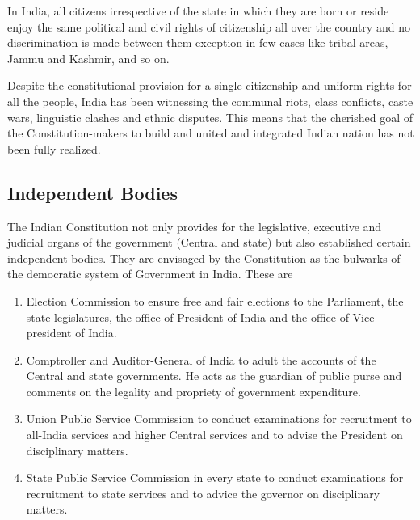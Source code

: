 \begin{multicols}{2}
In India, all citizens irrespective of the state in which they are born or reside enjoy the same political and civil rights of citizenship all over the country and no discrimination is made between them exception in few cases like tribal areas, Jammu and Kashmir, and so on.

Despite the constitutional provision for a single citizenship and uniform rights for all the people, India has been witnessing the communal riots, class conflicts, caste wars, linguistic clashes and ethnic disputes. This means that the cherished goal of the Constitution-makers to build and united and integrated Indian nation has not been fully realized.

\subsection{Independent Bodies}

The Indian Constitution not only provides for the legislative, executive and judicial organs of the government (Central and state) but also established certain independent bodies. They are envisaged by the Constitution as the bulwarks of the democratic system of Government in India. These are

\renewcommand{\labelenumi}{\textbf{(\alph{enumi})}}
\begin{enumerate}
  \item Election Commission to ensure free and fair elections to the Parliament, the state legislatures, the office of President of India and the office of Vice-president of India.
  \item Comptroller and Auditor-General of India to adult the accounts of the Central and state governments. He acts as the guardian of public purse and comments on the legality and propriety of government expenditure.
  \item Union Public Service Commission to conduct examinations for recruitment to all-India services and higher Central services and to advise the President on disciplinary matters.
  \item State Public Service Commission in every state to conduct examinations for recruitment to state services and to advice the governor on disciplinary matters.
\end{enumerate}


\end{multicols}
